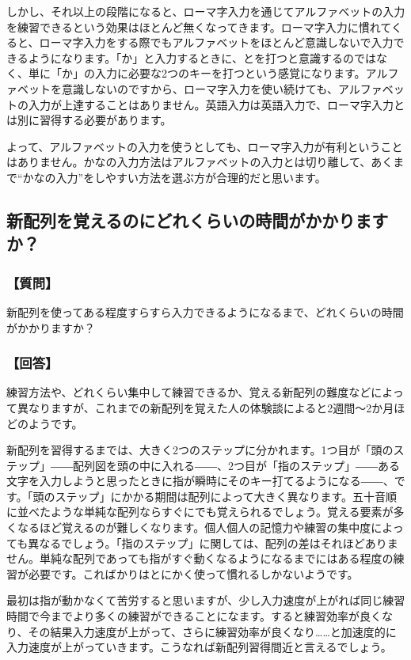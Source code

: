 しかし、それ以上の段階になると、ローマ字入力を通じてアルファベットの入力を練習できるという効果はほとんど無くなってきます。ローマ字入力に慣れてくると、ローマ字入力をする際でもアルファベットをほとんど意識しないで入力できるようになります。「か」と入力するときに、とを打つと意識するのではなく、単に「か」の入力に必要な2つのキーを打つという感覚になります。アルファベットを意識しないのですから、ローマ字入力を使い続けても、アルファベットの入力が上達することはありません。英語入力は英語入力で、ローマ字入力とは別に習得する必要があります。

よって、アルファベットの入力を使うとしても、ローマ字入力が有利ということはありません。かなの入力方法はアルファベットの入力とは切り離して、あくまで“かなの入力”をしやすい方法を選ぶ方が合理的だと思います。

\subsection{新配列を覚えるのにどれくらいの時間がかかりますか？}

\subsubsection*{【質問】}

新配列を使ってある程度すらすら入力できるようになるまで、どれくらいの時間がかかりますか？

\subsubsection*{【回答】}

練習方法や、どれくらい集中して練習できるか、覚える新配列の難度などによって異なりますが、これまでの新配列を覚えた人の体験談によると2週間～2か月ほどのようです。

新配列を習得するまでは、大きく2つのステップに分かれます。1つ目が「頭のステップ」――配列図を頭の中に入れる――、2つ目が「指のステップ」――ある文字を入力しようと思ったときに指が瞬時にそのキー打てるようになる――、です。「頭のステップ」にかかる期間は配列によって大きく異なります。五十音順に並べたような単純な配列ならすぐにでも覚えられるでしょう。覚える要素が多くなるほど覚えるのが難しくなります。個人個人の記憶力や練習の集中度によっても異なるでしょう。「指のステップ」に関しては、配列の差はそれほどありません。単純な配列であっても指がすぐ動くなるようになるまでにはある程度の練習が必要です。こればかりはとにかく使って慣れるしかないようです。

最初は指が動かなくて苦労すると思いますが、少し入力速度が上がれば同じ練習時間で今までより多くの練習ができることになます。すると練習効率が良くなり、その結果入力速度が上がって、さらに練習効率が良くなり……と加速度的に入力速度が上がっていきます。こうなれば新配列習得間近と言えるでしょう。

